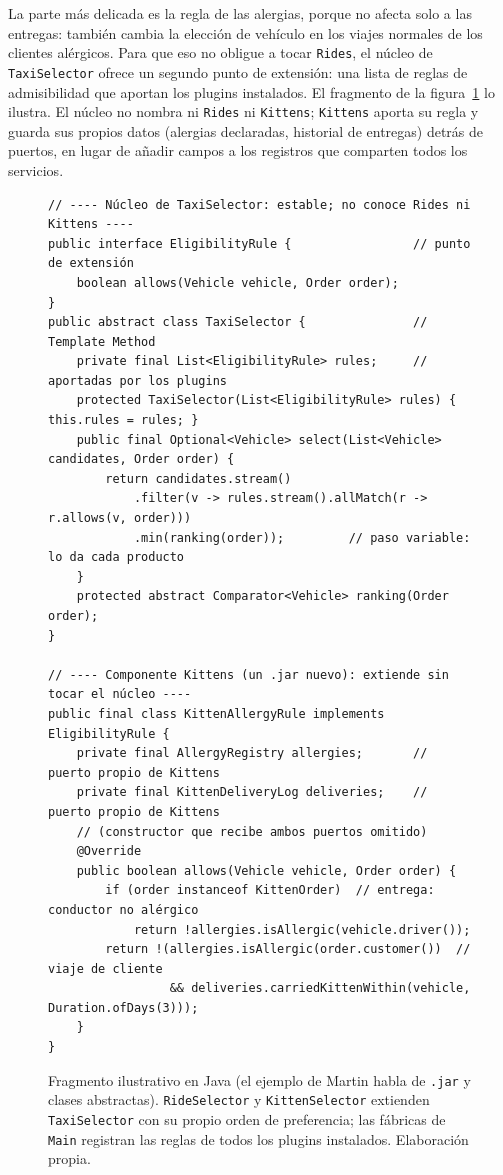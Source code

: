 La parte más delicada es la regla de las alergias, porque no afecta solo a las entregas: también
cambia la elección de vehículo en los viajes normales de los clientes alérgicos. Para que eso no
obligue a tocar \texttt{Rides}, el núcleo de \texttt{TaxiSelector} ofrece un segundo punto de
extensión: una lista de reglas de admisibilidad que aportan los plugins instalados. El
fragmento de la figura~\ref{fig:p5-codigo} lo ilustra. El núcleo no nombra ni \texttt{Rides} ni
\texttt{Kittens}; \texttt{Kittens} aporta su regla y guarda sus propios datos (alergias declaradas,
historial de entregas) detrás de puertos, en lugar de añadir campos a los registros que comparten
todos los servicios.

\begin{figure}[H]
  \centering
  \begin{minipage}{0.97\linewidth}
\footnotesize
\begin{verbatim}
// ---- Núcleo de TaxiSelector: estable; no conoce Rides ni Kittens ----
public interface EligibilityRule {                 // punto de extensión
    boolean allows(Vehicle vehicle, Order order);
}
public abstract class TaxiSelector {               // Template Method
    private final List<EligibilityRule> rules;     // aportadas por los plugins
    protected TaxiSelector(List<EligibilityRule> rules) { this.rules = rules; }
    public final Optional<Vehicle> select(List<Vehicle> candidates, Order order) {
        return candidates.stream()
            .filter(v -> rules.stream().allMatch(r -> r.allows(v, order)))
            .min(ranking(order));         // paso variable: lo da cada producto
    }
    protected abstract Comparator<Vehicle> ranking(Order order);
}

// ---- Componente Kittens (un .jar nuevo): extiende sin tocar el núcleo ----
public final class KittenAllergyRule implements EligibilityRule {
    private final AllergyRegistry allergies;       // puerto propio de Kittens
    private final KittenDeliveryLog deliveries;    // puerto propio de Kittens
    // (constructor que recibe ambos puertos omitido)
    @Override
    public boolean allows(Vehicle vehicle, Order order) {
        if (order instanceof KittenOrder)  // entrega: conductor no alérgico
            return !allergies.isAllergic(vehicle.driver());
        return !(allergies.isAllergic(order.customer())  // viaje de cliente
                 && deliveries.carriedKittenWithin(vehicle, Duration.ofDays(3)));
    }
}
\end{verbatim}
  \end{minipage}
  \caption{Fragmento ilustrativo en Java (el ejemplo de Martin habla de \texttt{.jar} y clases
    abstractas). \texttt{RideSelector} y \texttt{KittenSelector} extienden \texttt{TaxiSelector}
    con su propio orden de preferencia; las fábricas de \texttt{Main} registran las reglas de todos
    los plugins instalados. Elaboración propia.}
  \label{fig:p5-codigo}
\end{figure}

